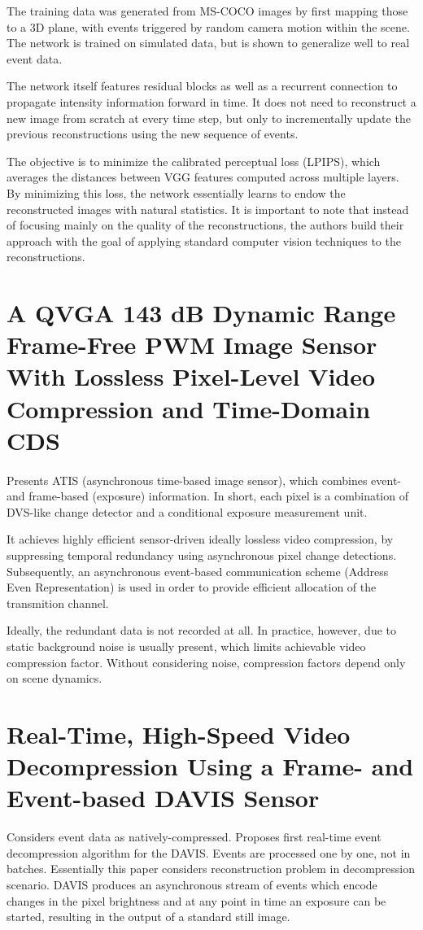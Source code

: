 \documentclass[10pt,a4paper]{article}
\begin{document}
The training data was generated from MS-COCO images by first mapping those to a 3D plane, with events triggered by random camera motion within the scene. The network is trained on simulated data, but is shown to generalize well to real event data.

The network itself features residual blocks as well as a recurrent connection to propagate intensity  information forward in time.
It does not need to reconstruct a new image from scratch at every time step, but only to incrementally update the previous reconstructions using the new sequence of events.

The objective is to minimize the calibrated perceptual loss (LPIPS), which averages the distances between VGG features computed across multiple layers. By minimizing this loss, the network essentially learns to endow the reconstructed images with natural statistics. It is important to note that instead of focusing mainly on the quality of the reconstructions, the authors build their approach with the goal of applying standard computer vision techniques to the reconstructions.

\section{A QVGA 143 dB Dynamic Range Frame-Free PWM Image Sensor With Lossless Pixel-Level Video Compression and Time-Domain CDS}
\paragraph{}
Presents ATIS (asynchronous time-based image sensor), which combines event- and frame-based (exposure) information.
In short, each pixel is a combination of DVS-like change detector and a conditional exposure measurement unit.

It achieves highly efficient sensor-driven ideally lossless video compression, by suppressing temporal redundancy using asynchronous pixel change detections.
Subsequently, an asynchronous event-based communication scheme (Address Even Representation) is used in order to provide efficient allocation of the transmition channel.

Ideally, the redundant data is not recorded at all. In practice, however, due to static background noise is usually present, which limits achievable video compression factor.
Without considering noise, compression factors depend only on scene dynamics.

\section{Real-Time, High-Speed Video Decompression Using a Frame- and Event-based DAVIS Sensor}
Considers event data as natively-compressed.
Proposes first real-time event decompression algorithm for the DAVIS.
Events are processed one by one, not in batches.
Essentially this paper considers reconstruction problem in decompression scenario.
DAVIS produces an asynchronous stream of events which encode changes in the pixel brightness and at any point in time an exposure can be started, resulting in the output of a standard still image.
\end{document}
